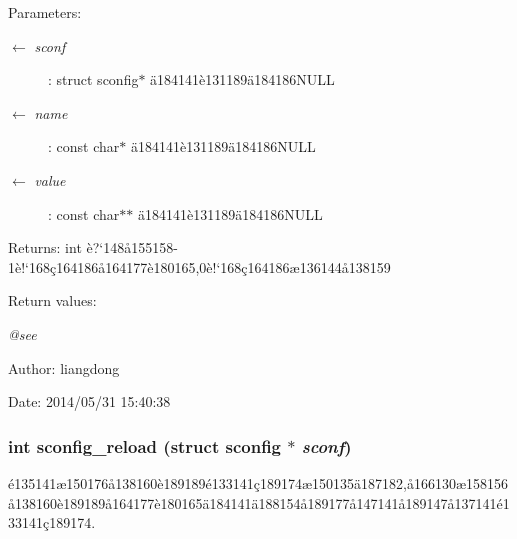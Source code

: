 \begin{Desc}
\item[Parameters:]
\begin{description}
\item[\mbox{$\leftarrow$} {\em sconf}]: struct sconfig$\ast$ \"{a}184141\`{e}131189\"{a}184186NULL \item[\mbox{$\leftarrow$} {\em name}]: const char$\ast$ \"{a}184141\`{e}131189\"{a}184186NULL \item[\mbox{$\leftarrow$} {\em value}]: const char$\ast$$\ast$ \"{a}184141\`{e}131189\"{a}184186NULL \end{description}
\end{Desc}
\begin{Desc}
\item[Returns:]int \`{e}?`148\aa{}155158-1\`{e}!`168\c{c}164186\aa{}164177\`{e}180165,0\`{e}!`168\c{c}164186\ae{}136144\aa{}138159 \end{Desc}
\begin{Desc}
\item[Return values:]
\begin{description}
\item[{\em @see}]\end{description}
\end{Desc}
\begin{Desc}
\item[Author:]liangdong \end{Desc}
\begin{Desc}
\item[Date:]2014/05/31 15:40:38 \end{Desc}
\subsubsection{\setlength{\rightskip}{0pt plus 5cm}int sconfig\_\-reload (struct sconfig $\ast$ {\em sconf})}\label{sconfig_8h_a2}


\'{e}135141\ae{}150176\aa{}138160\`{e}189189\'{e}133141\c{c}189174\ae{}150135\"{a}187182,\aa{}166130\ae{}158156\aa{}138160\`{e}189189\aa{}164177\`{e}180165\"{a}184141\"{a}188154\aa{}189177\aa{}147141\aa{}189147\aa{}137141\'{e}133141\c{c}189174. 

